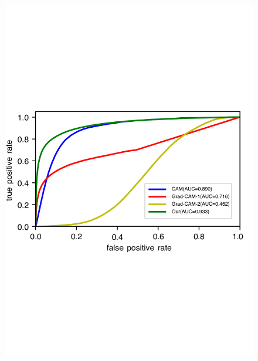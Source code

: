 \begin{figure}[h]
	\centering
	\includegraphics[width=1.0\textwidth]{figure/ROC_cam_grad_cam_our_simulated_skin_datasets}
	\caption{} 
	\label{fig:roc_cam_grad_cam_our_simulated_skin_datasets}
\end{figure}


